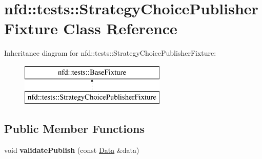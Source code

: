 \hypertarget{classnfd_1_1tests_1_1StrategyChoicePublisherFixture}{}\section{nfd\+:\+:tests\+:\+:Strategy\+Choice\+Publisher\+Fixture Class Reference}
\label{classnfd_1_1tests_1_1StrategyChoicePublisherFixture}
Inheritance diagram for nfd\+:\+:tests\+:\+:Strategy\+Choice\+Publisher\+Fixture\+:\begin{figure}[H]
\begin{center}
\leavevmode
\includegraphics[height=2.000000cm]{classnfd_1_1tests_1_1StrategyChoicePublisherFixture}
\end{center}
\end{figure}
\subsection*{Public Member Functions}
\begin{DoxyCompactItemize}
\item 
void {\bfseries validate\+Publish} (const \hyperlink{classndn_1_1Data}{Data} \&data)\hypertarget{classnfd_1_1tests_1_1StrategyChoicePublisherFixture_a500501e7b385f3d81be4ab21321dcd0d}{}\label{classnfd_1_1tests_1_1StrategyChoicePublisherFixture_a500501e7b385f3d81be4ab21321dcd0d}

\end{DoxyCompactItemize}
